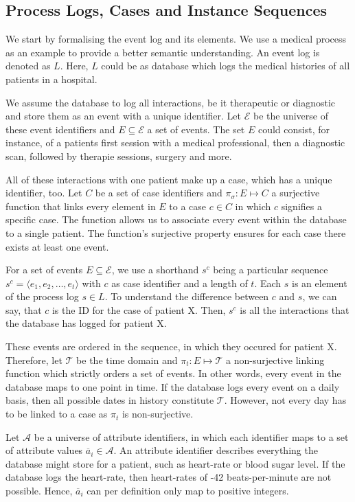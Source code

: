 \documentclass[./../../paper.tex]{subfiles}
\begin{document}
\subsection{Process Logs, Cases and Instance Sequences}


We start by formalising the event log and its elements. We use a medical process as an example to provide a better semantic understanding. An event log is denoted as $L$. Here, $L$ could be as database which logs the medical histories of all patients in a hospital. 

We assume the database to log all interactions, be it therapeutic or diagnostic and store them as an event with a unique identifier. Let $\mathcal{E}$ be the universe of  these event identifiers and $E \subseteq \mathcal{E}$ a set of events. The set $E$ could consist, for instance, of a patients first session with a medical professional, then a diagnostic scan, followed by therapie sessions, surgery and more. 

All of these interactions with one patient make up a case, which has a unique identifier, too. Let $C$ be a set of case identifiers and $\pi_\sigma : E \mapsto C$ a surjective function that links every element in $E$ to a case $c \in C$ in which $c$ signifies a specific case. The function allows us to associate every event within the database to a single patient. The function's surjective property ensures for each case there exists at least one event.

For a set of events $E \subseteq \mathcal{E}$, we use a shorthand $s^c$ being a particular sequence $s^c = \langle e_1, e_2, \ldots, e_t \rangle$ with $c$ as case identifier and a length of $t$. Each $s$ is an element of the process log $s \in L$. To understand the difference between $c$ and $s$, we can say, that $c$ is the ID for the case of patient X. Then, $s^c$ is all the interactions that the database has logged for patient X. 


These events are ordered in the sequence, in which they occured for patient X.  Therefore, let $\mathcal{T}$ be the time domain and $\pi_t : E \mapsto \mathcal{T}$ a non-surjective linking function which strictly orders a set of events. In other words, every event in the database maps to one point in time. If the database logs every event on a daily basis, then all possible dates in history constitute $\mathcal{T}$. However, not every day has to be linked to a case as $\pi_t$ is non-surjective. 

Let $\mathcal{A}$ be a universe of attribute identifiers,  in which each identifier maps to a set of attribute values $\overline{a}_i \in \mathcal{A}$. An attribute identifier describes everything the database might store for a patient, such as heart-rate or blood sugar level. If the database logs the heart-rate, then heart-rates of -42 beats-per-minute are not possible. Hence, $\overline{a}_i$ can per definition only map to positive integers. 
\end{document}
